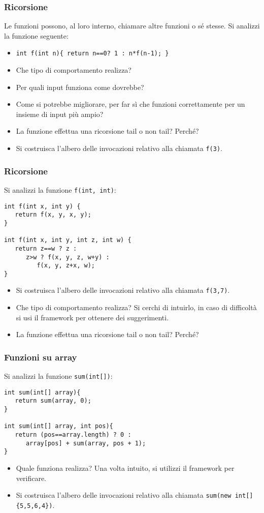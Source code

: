 \documentclass{beamer}
\begin{document}
\begin{frame}
\frametitle{Ricorsione}
Le funzioni possono, al loro interno, chiamare altre funzioni o sé stesse. Si analizzi la funzione seguente: 
\begin{itemize}
 \item \texttt{int f(int n)\{ return n==0? 1 : n*f(n-1); \}}
\end{itemize}
\begin{itemize}
 \item Che tipo di comportamento realizza?
 \item Per quali input funziona come dovrebbe?
 \item Come si potrebbe migliorare, per far sì che funzioni correttamente per un insieme di input più ampio?
  \item La funzione effettua una ricorsione tail o non tail? Perché?
 \item Si costruisca l'albero delle invocazioni relativo alla chiamata \texttt{f(3)}.
\end{itemize}
\end{frame}

\begin{frame}[fragile]
\frametitle{Ricorsione}
Si analizzi la funzione \texttt{f(int, int)}:
\begin{verbatim}
int f(int x, int y) {
   return f(x, y, x, y);
}

int f(int x, int y, int z, int w) {
   return z==w ? z :
      z>w ? f(x, y, z, w+y) :
         f(x, y, z+x, w);
}
\end{verbatim}
\begin{itemize}
 \item Si costruisca l'albero delle invocazioni relativo alla chiamata \texttt{f(3,7)}.
 \item Che tipo di comportamento realizza? Si cerchi di intuirlo, in caso di difficoltà si usi il framework per ottenere dei suggerimenti.
  \item La funzione effettua una ricorsione tail o non tail? Perché?
\end{itemize}
\end{frame}

\begin{frame}[fragile]
\frametitle{Funzioni su array}
Si analizzi la funzione \texttt{sum(int[])}:
\begin{verbatim}
int sum(int[] array){
   return sum(array, 0);
}

int sum(int[] array, int pos){
   return (pos==array.length) ? 0 :
      array[pos] + sum(array, pos + 1);
}
\end{verbatim}
\begin{itemize}
 \item Quale funziona realizza? Una volta intuito, si utilizzi il framework per verificare.
 \item Si costruisca l'albero delle invocazioni relativo alla chiamata \texttt{sum(new int[]\{5,5,6,4\})}. 
\end{itemize}
\end{frame}
\end{document}
